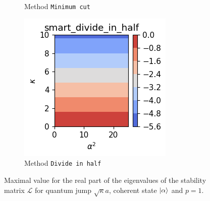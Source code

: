 \begin{figure}[h!]
\begin{subfigure}{0.32\linewidth}
        \caption{Method \texttt{Minimum cut}}
        \label{fig:H_0_and_losses_1_p_1_rule_min-cut}
    \end{subfigure}
    \hfill
    \begin{subfigure}{0.32\linewidth}
        \centering
        \includegraphics[width=\linewidth]{Pics/H_0_and_losses_1_p_1_rule_smart_divide_in_half.pdf}
        \caption{Method \texttt{Divide in half}}
        \label{fig:H_0_and_losses_1_p_1_rule_smart_divide_in_half}
    \end{subfigure}
    \caption{Maximal value for the real part of the eigenvalues of the stability matrix $\mathcal{L}$ for quantum jump $\sqrt{\kappa} a$, coherent state $\ket{\alpha}$ and $p=1$.}
    \label{fig:CompStab1Loss}
\end{figure}

